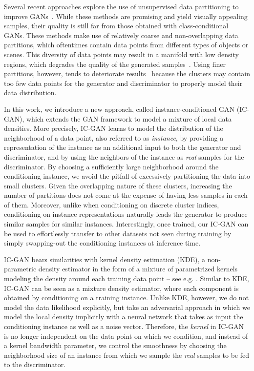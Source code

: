 Several recent approaches explore the use of unsupervised data partitioning to improve GANs~\cite{armandpour2021partition,eghbal2019mixture,Ghosh_2018_CVPR,hoang2018mgan,liu2020diverse,noroozi2020self}. While these methods are promising and yield visually appealing samples, their quality is still far from those obtained with class-conditional GANs. These methods make use of relatively coarse and non-overlapping data partitions, which oftentimes contain data points from different types of objects or scenes. This diversity of data points may result in a manifold with low density regions, which degrades the quality of the generated samples~\cite{devries2020instance}. Using finer partitions, however, tends to deteriorate  results~\cite{liu2020diverse,pmlr-v97-lucic19a,noroozi2020self} because the clusters may contain too few data points for the generator and discriminator to properly model their data distribution.

In this work, we introduce a new approach, called instance-conditioned GAN ({IC-GAN}), which extends the GAN framework to model a mixture of local data densities. More precisely, {IC-GAN} learns to model the distribution of the neighborhood of a data point, also referred to as \textit{instance}, by providing a representation of the instance as an additional input to both the generator and discriminator, and by using the neighbors of the instance as \emph{real} samples for the discriminator. By choosing a sufficiently large neighborhood around the conditioning instance, we avoid the pitfall of excessively partitioning the data into small clusters. Given the overlapping nature of these clusters, increasing the number of partitions does not come at the expense of having less samples in each of them. Moreover, unlike when conditioning on discrete cluster indices, conditioning on instance representations naturally leads the generator to produce similar samples for similar instances. Interestingly, once trained, our {IC-GAN} can be used to effortlessly transfer to other datasets not seen during training by simply swapping-out the conditioning instances at inference time. 

{IC-GAN} bears  similarities with kernel density estimation (KDE), a non-parametric density estimator in the form of a mixture of parametrized kernels modeling the density around each training data point -- see e.g. \cite{bishop06patrec}. Similar to KDE, {IC-GAN} can be seen as a mixture density estimator, where each component is obtained by conditioning on a training instance. Unlike KDE, however, we do not model the data likelihood explicitly, but take an adversarial approach in which we model the local density implicitly with a neural network that takes as input the conditioning instance as well as a noise vector. Therefore, the \emph{kernel} in {IC-GAN} is no longer independent on the data point on which we condition, and instead of a kernel bandwidth parameter, we control the smoothness by choosing the neighborhood size of an instance from which we sample the \emph{real} samples to be fed to the discriminator.

